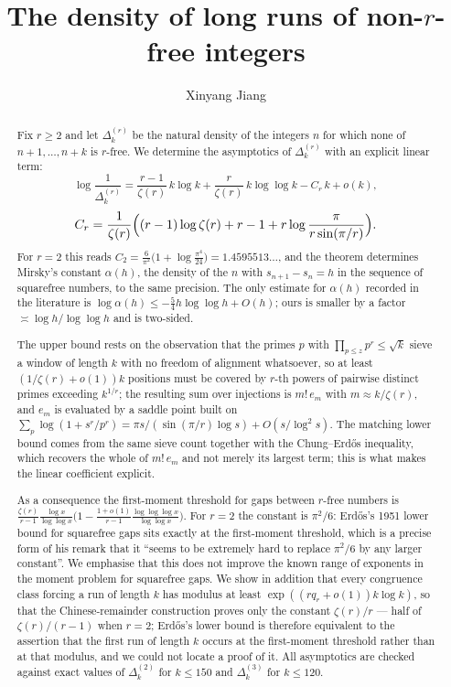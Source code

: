 \documentclass[11pt,reqno]{amsart}
\theoremstyle{plain}
\theoremstyle{definition}
\numberwithin{equation}{section}
\begin{document}
\title[The density of long runs of non-$r$-free integers]
{The density of long runs of non-$r$-free integers}

\author{Xinyang Jiang}


\begin{abstract}
Fix $r\ge2$ and let $\Delta^{(r)}_k$ be the natural density of the integers $n$ for which
none of $n+1,\dots,n+k$ is $r$-free. We determine the asymptotics of $\Delta^{(r)}_k$ with
an explicit linear term:
\[
  \log\frac1{\Delta^{(r)}_k}
  =\frac{r-1}{\zeta(r)}\,k\log k+\frac{r}{\zeta(r)}\,k\log\log k-C_r\,k+o(k),
\]
\[
  C_r=\frac1{\zeta(r)}\Bigl((r-1)\log\zeta(r)+r-1+r\log\frac{\pi}{r\sin(\pi/r)}\Bigr).
\]
For $r=2$ this reads $C_2=\frac{6}{\pi^{2}}\bigl(1+\log\frac{\pi^{4}}{24}\bigr)
=1.4595513\ldots$, and the theorem determines Mirsky's constant $\alpha(h)$, the density of
the $n$ with $s_{n+1}-s_n=h$ in the sequence of squarefree numbers, to the same precision.
The only estimate for $\alpha(h)$ recorded in the literature is
$\log\alpha(h)\le-\frac54h\log\log h+O(h)$; ours is smaller by a factor
$\asymp\log h/\log\log h$ and is two-sided.

The upper bound rests on the observation that the primes $p$ with $\prod_{p\le z}p^{r}\le
\sqrt k$ sieve a window of length $k$ with no freedom of alignment whatsoever, so at least
$(1/\zeta(r)+o(1))k$ positions must be covered by $r$-th powers of pairwise distinct primes
exceeding $k^{1/r}$; the resulting sum over injections is $m!\,e_m$ with
$m\approx k/\zeta(r)$, and $e_m$ is evaluated by a saddle point built on
$\sum_p\log(1+s^{r}/p^{r})=\pi s/(\sin(\pi/r)\log s)+O(s/\log^{2}s)$. The matching lower
bound comes from the same sieve count together with the Chung--Erd\H{o}s inequality, which
recovers the whole of $m!\,e_m$ and not merely its largest term; this is what makes the
linear coefficient explicit.

As a consequence the first-moment threshold for gaps between $r$-free numbers is
$\frac{\zeta(r)}{r-1}\frac{\log x}{\log\log x}\bigl(1-\frac{1+o(1)}{r-1}
\frac{\log\log\log x}{\log\log x}\bigr)$. For $r=2$ the constant is $\pi^{2}/6$: Erd\H{o}s's
1951 lower bound for squarefree gaps sits exactly at the first-moment threshold, which is a
precise form of his remark that it ``seems to be extremely hard to replace $\pi^{2}/6$ by
any larger constant''. We emphasise that this does not improve the known range of exponents
in the moment problem for squarefree gaps. We show in addition that every congruence class
forcing a run of length $k$ has modulus at least $\exp((r q_r+o(1))k\log k)$, so that the
Chinese-remainder construction proves only the constant $\zeta(r)/r$ --- half of
$\zeta(r)/(r-1)$ when $r=2$; Erd\H{o}s's lower bound is therefore equivalent to the
assertion that the first run of length $k$ occurs at the first-moment threshold rather than
at that modulus, and we could not locate a proof of it. All asymptotics are checked against
exact values of $\Delta^{(2)}_k$ for $k\le150$ and $\Delta^{(3)}_k$ for $k\le120$.
\end{abstract}
\end{document}
